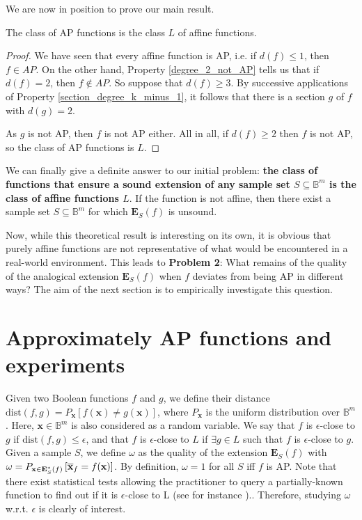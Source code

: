 We are now in position to prove our main result.

\begin{proposition}\label{AP_is_L}
The class of AP functions is the class $L$ of affine functions.
\end{proposition}
\begin{proof}
We have seen that every affine function is AP, i.e. if $d(f)\leq 1$, then $f\in
  AP$. On the other hand, Property \ref{degree_2_not_AP} tells us that if
  $d(f)=2$, then $f \notin AP$. So suppose that  $d(f)\geq 3$. By successive
  applications of Property \ref{section_degree_k_minus_1}, it follows that
  there is a section $g$ of $f$ with $d(g)=2$.

  As $g$ is not AP, then $f$ is not AP either. All in all, if $d(f) \geq 2$
  then $f$ is not AP, so the class of AP functions is $L$.
\end{proof}

We can finally give a definite answer to our initial problem: {\bf the class of
functions that ensure a sound extension of any sample set $S \subseteq
\mathbb{B}^m$ is the class of affine functions $L$}. If the function is not
affine, then there exist a sample set $S \subseteq \mathbb{B}^m$ for which
$\mathbf{E}_S(f)$ is unsound.

Now, while this theoretical result is interesting on its own, it is obvious
that purely affine functions are not representative of what would be
encountered in a real-world environment.  This leads to {\bf Problem 2}: What
remains of the quality of the analogical extension $\mathbf{E}_S(f)$ when $f$
deviates from being AP in different ways?  The aim of the next section is to
empirically investigate this question.

\section{Approximately AP functions and experiments}
\label{approximate_ap_functions}

Given two Boolean functions $f$ and $g$, we define their distance
$\text{dist}(f, g) = P_\mathbf{x}\left[f(\mathbf{x}) \neq
g(\mathbf{x})\right]$, where $P_\mathbf{x}$ is the uniform distribution over
$\mathbb{B}^m$. Here, $\mathbf{x} \in \mathbb{B}^m$ is also considered as a
random variable. We say that $f$ is $\epsilon$-close to $g$ if $\text{dist}(f,
g) \leq \epsilon$, and that $f$ is $\epsilon$-close to $L$ if $\exists g \in L$
such that $f$ is $\epsilon$-close to $g$. Given a sample $S$, we define
$\omega$ as the quality of the extension $\mathbf{E}_S(f)$ with $\omega =
P_{\mathbf{x}\in \mathbf{E}^*_S(f)}\left[\overline{\mathbf{x}}_f =
f(\mathbf{x})\right]$. By definition, $\omega=1$ for all $S$ iff $f$ is AP.
Note that there exist statistical tests allowing the practitioner to query a
partially-known function to find out if it is $\epsilon$-close to L (see for
instance \cite{BluLubRub93}).. Therefore, studying $\omega$ w.r.t. $\epsilon$
is clearly of interest.

